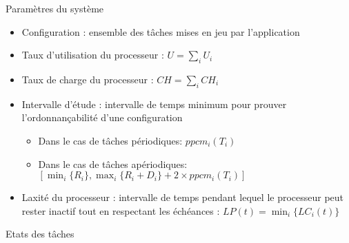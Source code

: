
\begin{frame}{Paramètres du système}
  \begin{itemize} 
  \item  Configuration  :  ensemble   des  tâches  mises  en  jeu  par
    l'application
  \item Taux d'utilisation du processeur : $U = \sum_i U_i$
  \item Taux de charge du processeur : $CH = \sum_i CH_i$
  \item Intervalle d'étude :  intervalle de temps minimum pour prouver
    l'ordonnançabilité  d'une  configuration
    \begin{itemize} 
    \item  Dans  le  cas de  tâches périodiques: $ppcm_i(T_i)$
    \item  Dans le cas  de tâches  apériodiques: $\left[\min_i\{R_i\},
        \max_i\{R_i + D_i\} + 2 \times ppcm_i(T_i)\right]$
    \end{itemize} 
  \item Laxité du  processeur : intervalle de temps  pendant lequel le
    processeur peut rester inactif  tout en respectant les échéances :
    $ LP(t) = \min_i\{LC_i(t)\}$
  \end{itemize} 
\end{frame} 

\begin{frame}{Etats des tâches}
  \begin{center}
  \end{center}
\end{frame} 


